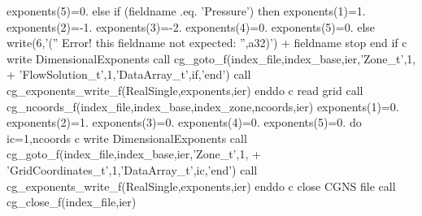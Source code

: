 \documentclass[12pt]{article}
\begin{document}
{\newline\indent\indent\indent          exponents(5)=0.
\newline\indent\indent        else if (fieldname .eq. 'Pressure') then
\newline\indent\indent\indent          exponents(1)=1.
\newline\indent\indent\indent          exponents(2)=-1.
\newline\indent\indent\indent          exponents(3)=-2.
\newline\indent\indent\indent          exponents(4)=0.
\newline\indent\indent\indent          exponents(5)=0.
\newline\indent\indent        else
\newline\indent\indent\indent          write(6,'('' Error! this fieldname not expected: '',a32)')
\newline + \indent\indent\indent     fieldname
\newline\indent\indent\indent          stop
\newline\indent\indent        end if
\newline c   write DimensionalExponents
\newline\indent\indent        call cg\_goto\_f(index\_file,index\_base,ier,'Zone\_t',1,
\newline + \indent\indent   'FlowSolution\_t',1,'DataArray\_t',if,'end')
\newline\indent\indent        call cg\_exponents\_write\_f(RealSingle,exponents,ier)
\newline\indent      enddo
\newline c   read grid
\newline\indent      call cg\_ncoords\_f(index\_file,index\_base,index\_zone,ncoords,ier)
\newline\indent      exponents(1)=0.
\newline\indent      exponents(2)=1.
\newline\indent      exponents(3)=0.
\newline\indent      exponents(4)=0.
\newline\indent      exponents(5)=0.
\newline\indent      do ic=1,ncoords
\newline c   write DimensionalExponents
\newline\indent\indent        call cg\_goto\_f(index\_file,index\_base,ier,'Zone\_t',1,
\newline + \indent\indent    'GridCoordinates\_t',1,'DataArray\_t',ic,'end')
\newline\indent\indent        call cg\_exponents\_write\_f(RealSingle,exponents,ier)
\newline\indent      enddo
\newline c   close CGNS file
\newline\indent      call cg\_close\_f(index\_file,ier)
}
\end{document}
